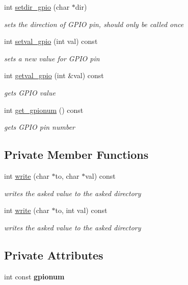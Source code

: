 \begin{DoxyCompactItemize}
int \mbox{\hyperlink{classPin_a40c6f300d3c97b653fb598ca36a8d778}{setdir\+\_\+gpio}} (char $\ast$dir)
\begin{DoxyCompactList}\small\item\em sets the direction of G\+P\+IO pin, should only be called once \end{DoxyCompactList}\item 
int \mbox{\hyperlink{classPin_a319c0b85b6b667b6708fe501a47c061c}{setval\+\_\+gpio}} (int val) const
\begin{DoxyCompactList}\small\item\em sets a new value for G\+P\+IO pin \end{DoxyCompactList}\item 
int \mbox{\hyperlink{classPin_a04fc4921bf674049be0d06842709913f}{getval\+\_\+gpio}} (int \&val) const
\begin{DoxyCompactList}\small\item\em gets G\+P\+IO value \end{DoxyCompactList}\item 
int \mbox{\hyperlink{classPin_a180d487895b4fc270437af97a0428f22}{get\+\_\+gpionum}} () const
\begin{DoxyCompactList}\small\item\em gets G\+P\+IO pin number \end{DoxyCompactList}\end{DoxyCompactItemize}
\subsection*{Private Member Functions}
\begin{DoxyCompactItemize}
\item 
int \mbox{\hyperlink{classPin_a1ab3312c109c400607d3242f0463941b}{write}} (char $\ast$to, char $\ast$val) const
\begin{DoxyCompactList}\small\item\em writes the asked value to the asked directory \end{DoxyCompactList}\item 
int \mbox{\hyperlink{classPin_a800322aedd71b00ea963876b6628be68}{write}} (char $\ast$to, int val) const
\begin{DoxyCompactList}\small\item\em writes the asked value to the asked directory \end{DoxyCompactList}\end{DoxyCompactItemize}
\subsection*{Private Attributes}
\begin{DoxyCompactItemize}
\item 
\mbox{\label{classPin_a1e8d9e0fd44e407c7a4ebcfa7f72e199}} 
int const {\bfseries gpionum}
\end{DoxyCompactItemize}


